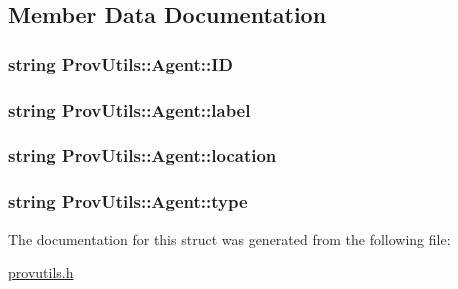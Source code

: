 \subsection{Member Data Documentation}
\hypertarget{struct_prov_utils_1_1_agent_a306ec064cb69d3a6ac4fc0cf77c10b53}{
\subsubsection[{I\-D}]{\setlength{\rightskip}{0pt plus 5cm}string Prov\-Utils\-::\-Agent\-::\-I\-D}}\label{struct_prov_utils_1_1_agent_a306ec064cb69d3a6ac4fc0cf77c10b53}
\hypertarget{struct_prov_utils_1_1_agent_a3a9574d1061f33684ff8fb85d5a9ed60}{
\subsubsection[{label}]{\setlength{\rightskip}{0pt plus 5cm}string Prov\-Utils\-::\-Agent\-::label}}\label{struct_prov_utils_1_1_agent_a3a9574d1061f33684ff8fb85d5a9ed60}
\hypertarget{struct_prov_utils_1_1_agent_a950c27a3d264ecb209fbb09151a86148}{
\subsubsection[{location}]{\setlength{\rightskip}{0pt plus 5cm}string Prov\-Utils\-::\-Agent\-::location}}\label{struct_prov_utils_1_1_agent_a950c27a3d264ecb209fbb09151a86148}
\hypertarget{struct_prov_utils_1_1_agent_a1afa29b1a7cc51f53535d392a09914ac}{
\subsubsection[{type}]{\setlength{\rightskip}{0pt plus 5cm}string Prov\-Utils\-::\-Agent\-::type}}\label{struct_prov_utils_1_1_agent_a1afa29b1a7cc51f53535d392a09914ac}


The documentation for this struct was generated from the following file\-:\begin{DoxyCompactItemize}
\item 
\hyperlink{provutils_8h}{provutils.\-h}\end{DoxyCompactItemize}
